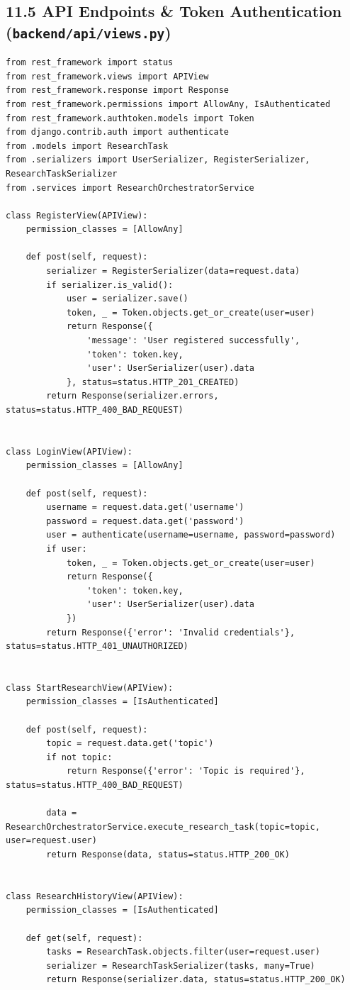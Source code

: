 \documentclass[12pt, a4paper]{article}
\begin{document}
\clearpage
\subsection{11.5 API Endpoints \& Token Authentication (\texttt{backend/api/views.py})}

\begin{lstlisting}[style=pythonstyle, caption={backend/api/views.py --- DRF Endpoint Handlers}]
from rest_framework import status
from rest_framework.views import APIView
from rest_framework.response import Response
from rest_framework.permissions import AllowAny, IsAuthenticated
from rest_framework.authtoken.models import Token
from django.contrib.auth import authenticate
from .models import ResearchTask
from .serializers import UserSerializer, RegisterSerializer, ResearchTaskSerializer
from .services import ResearchOrchestratorService

class RegisterView(APIView):
    permission_classes = [AllowAny]

    def post(self, request):
        serializer = RegisterSerializer(data=request.data)
        if serializer.is_valid():
            user = serializer.save()
            token, _ = Token.objects.get_or_create(user=user)
            return Response({
                'message': 'User registered successfully',
                'token': token.key,
                'user': UserSerializer(user).data
            }, status=status.HTTP_201_CREATED)
        return Response(serializer.errors, status=status.HTTP_400_BAD_REQUEST)


class LoginView(APIView):
    permission_classes = [AllowAny]

    def post(self, request):
        username = request.data.get('username')
        password = request.data.get('password')
        user = authenticate(username=username, password=password)
        if user:
            token, _ = Token.objects.get_or_create(user=user)
            return Response({
                'token': token.key,
                'user': UserSerializer(user).data
            })
        return Response({'error': 'Invalid credentials'}, status=status.HTTP_401_UNAUTHORIZED)


class StartResearchView(APIView):
    permission_classes = [IsAuthenticated]

    def post(self, request):
        topic = request.data.get('topic')
        if not topic:
            return Response({'error': 'Topic is required'}, status=status.HTTP_400_BAD_REQUEST)
        
        data = ResearchOrchestratorService.execute_research_task(topic=topic, user=request.user)
        return Response(data, status=status.HTTP_200_OK)


class ResearchHistoryView(APIView):
    permission_classes = [IsAuthenticated]

    def get(self, request):
        tasks = ResearchTask.objects.filter(user=request.user)
        serializer = ResearchTaskSerializer(tasks, many=True)
        return Response(serializer.data, status=status.HTTP_200_OK)
\end{lstlisting}
\end{document}
